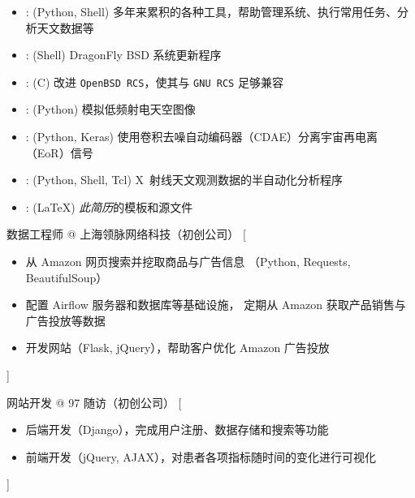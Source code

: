 \documentclass[zh]{resume}
\begin{document}
\begin{itemize}
  \item {}:
    (Python, Shell)
    多年来累积的各种工具，帮助管理系统、执行常用任务、分析天文数据等
  \item {}:
    (Shell)
    DragonFly BSD 系统更新程序
  \item {}:
    (C)
    改进 \texttt{OpenBSD RCS}，使其与 \texttt{GNU RCS} 足够兼容
  \item {}:
    (Python)
    模拟低频射电天空图像
  \item {}:
    (Python, Keras)
    使用卷积去噪自动编码器（CDAE）分离宇宙再电离（EoR）信号
  \item {}:
    (Python, Shell, Tcl)
    X~射线天文观测数据的半自动化分析程序
  \item {}:
    (\LaTeX)
    \emph{此简历}的模板和源文件
\end{itemize}


\begin{experiences}
    {数据工程师 @ 上海领脉网络科技（初创公司）}%
    [\begin{itemize}
      \item 从 Amazon 网页搜索并挖取商品与广告信息
        （Python, Requests, BeautifulSoup）
      \item 配置 Airflow 服务器和数据库等基础设施，
        定期从 Amazon 获取产品销售与广告投放等数据
      \item 开发网站（Flask, jQuery），帮助客户优化 Amazon 广告投放
    \end{itemize}]

  \separator{0.5ex}
    {网站开发 @ 97 随访（初创公司）}%
    [\begin{itemize}
      \item 后端开发（Django），完成用户注册、数据存储和搜索等功能
      \item 前端开发（jQuery, AJAX），对患者各项指标随时间的变化进行可视化
    \end{itemize}]
\end{experiences}
\end{document}
